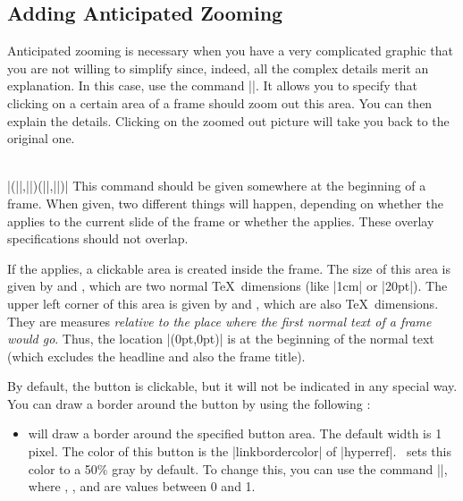 \subsection{Adding Anticipated Zooming}
\label{section-zooming}

Anticipated zooming is necessary when you have a very complicated graphic that you are not willing to simplify since, indeed, all the complex details merit an explanation. In this case, use the command |\framezoom|. It allows you to specify that clicking on a certain area of a frame should zoom out this area. You can then explain the details. Clicking on the zoomed out picture will take you back to the original one.

\begin{command}{\framezoom{}\\|(||,||)(||,||)|}
  This command should be given somewhere at the beginning of a frame. When given, two different things will happen, depending on whether the  applies to the current slide of the frame or whether the  applies. These overlay specifications should not overlap.

  If the  applies, a clickable area is created inside the frame. The size of this area is given by  and , which are two normal \TeX\ dimensions (like |1cm| or |20pt|). The upper left corner of this area is given by  and , which are also \TeX\ dimensions. They are measures \emph{relative to the place where the first normal text of a frame would go}. Thus, the location |(0pt,0pt)| is at the beginning of the normal text (which excludes the headline and also the frame title).

  By default, the button is clickable, but it will not be indicated in any special way. You can draw a border around the button by using the following :
  \begin{itemize}
  \item
     will draw a border around the specified button area. The default width is 1 pixel. The color of this  button is the |linkbordercolor| of |hyperref|. \beamer\ sets this color to a 50\% gray by default.\newline    
    To change this, you can use the command ||, where , , and  are values between 0 and 1.
  \end{itemize}


\end{command}
